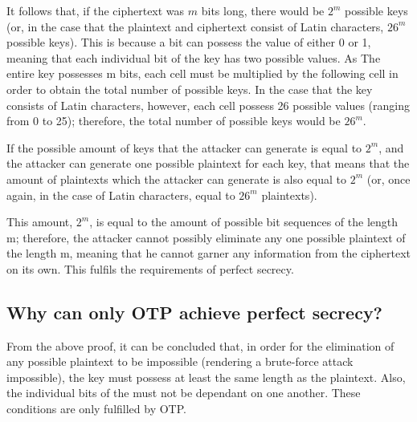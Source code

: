 \documentclass[12pt]{report}
\begin{document}
It follows that, if the ciphertext was $m$ bits long, there would be $2^m$ possible keys (or, in the case that the plaintext and ciphertext consist of Latin characters, $26^m$ possible keys). This is because a bit can possess the value of either 0 or 1, meaning that each individual bit of the key has two possible values. As The entire key possesses m bits, each cell must be multiplied by the following cell in order to obtain the total number of possible keys. In the case that the key consists of Latin characters, however, each cell possess 26 possible values (ranging from 0 to 25); therefore, the total number of possible keys would be $26^m$.

If the possible amount of keys that the attacker can generate is equal to $2^m$, and the attacker can generate one possible plaintext for each key, that means that the amount of plaintexts which the attacker can generate is also equal to $2^m$ (or, once again, in the case of Latin characters, equal to $26^m$ plaintexts).

This amount, $2^m$, is equal to the amount of possible bit sequences of the length m; therefore, the attacker cannot possibly eliminate any one possible plaintext of the length m, meaning that he cannot garner any information from the ciphertext on its own. This fulfils the requirements of perfect secrecy.


\subsection{Why can only OTP achieve perfect secrecy?}

From the above proof, it can be concluded that, in order for the elimination of any possible plaintext to be impossible (rendering a brute-force attack impossible), the key must possess at least the same length as the plaintext. Also, the individual bits of the must not be dependant on one another. These conditions are only fulfilled by OTP.  
\end{document}
